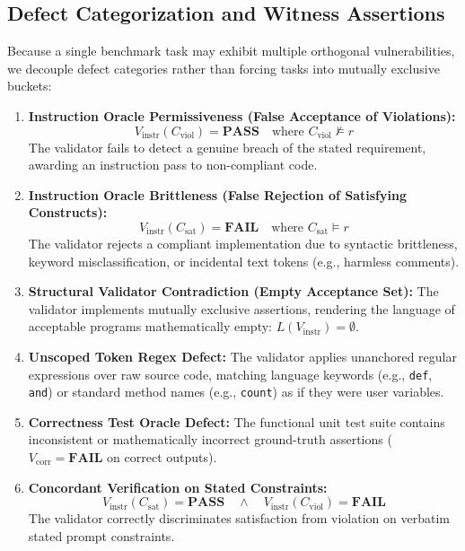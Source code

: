 \documentclass[runningheads]{llncs}
\begin{document}
\subsection{Defect Categorization and Witness Assertions}
Because a single benchmark task may exhibit multiple orthogonal vulnerabilities, we decouple defect categories rather than forcing tasks into mutually exclusive buckets:
\begin{enumerate}[leftmargin=*]
    \item \textbf{Instruction Oracle Permissiveness (False Acceptance of Violations):}
    \begin{equation}
    V_{\text{instr}}(C_{\text{viol}}) = \textbf{PASS} \quad \text{where } C_{\text{viol}} \not\models r
    \end{equation}
    The validator fails to detect a genuine breach of the stated requirement, awarding an instruction pass to non-compliant code.
    \item \textbf{Instruction Oracle Brittleness (False Rejection of Satisfying Constructs):}
    \begin{equation}
    V_{\text{instr}}(C_{\text{sat}}) = \textbf{FAIL} \quad \text{where } C_{\text{sat}} \models r
    \end{equation}
    The validator rejects a compliant implementation due to syntactic brittleness, keyword misclassification, or incidental text tokens (e.g., harmless comments).
    \item \textbf{Structural Validator Contradiction (Empty Acceptance Set):}
    The validator implements mutually exclusive assertions, rendering the language of acceptable programs mathematically empty: $L(V_{\text{instr}}) = \emptyset$.
    \item \textbf{Unscoped Token Regex Defect:}
    The validator applies unanchored regular expressions over raw source code, matching language keywords (e.g., \texttt{def}, \texttt{and}) or standard method names (e.g., \texttt{count}) as if they were user variables.
    \item \textbf{Correctness Test Oracle Defect:}
    The functional unit test suite contains inconsistent or mathematically incorrect ground-truth assertions ($V_{\text{corr}} = \textbf{FAIL}$ on correct outputs).
    \item \textbf{Concordant Verification on Stated Constraints:}
    \begin{equation}
    V_{\text{instr}}(C_{\text{sat}}) = \textbf{PASS} \quad \land \quad V_{\text{instr}}(C_{\text{viol}}) = \textbf{FAIL}
    \end{equation}
    The validator correctly discriminates satisfaction from violation on verbatim stated prompt constraints.
\end{enumerate}
\end{document}
